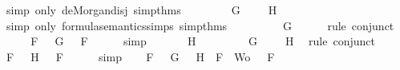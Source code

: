 \begin{isabellebody}
\ {\isacharparenleft}simp\ only{\isacharcolon}\ de{\isacharunderscore}Morgan{\isacharunderscore}disj\ simp{\isacharunderscore}thms{\isacharparenleft}{}{\isacharparenright}{\isacharparenright}\isanewline
\ \ \isamarkupfalse%
\ \isamarkupfalse%
\ {\isachardoublequoteopen}{\isasymA}\ {\isasymTurnstile}\ \isactrlbold {\isasymnot}\ G\ {\isasymand}\ {\isasymA}\ {\isasymTurnstile}\ \isactrlbold {\isasymnot}\ H{\isachardoublequoteclose}\isanewline
\ \ \ \ \isamarkupfalse%
\ {\isacharparenleft}simp\ only{\isacharcolon}\ formula{\isacharunderscore}semantics{\isachardot}simps{\isacharparenleft}{}{\isacharparenright}\ simp{\isacharunderscore}thms{\isacharparenleft}{}{\isacharparenright}{\isacharparenright}\ \isanewline
\ \ \isamarkupfalse%
\ \isamarkupfalse%
\ {\isachardoublequoteopen}{\isasymA}\ {\isasymTurnstile}\ \isactrlbold {\isasymnot}\ G{\isachardoublequoteclose}\isanewline
\ \ \ \ \isamarkupfalse%
\ {\isacharparenleft}rule\ conjunct{}{\isacharparenright}\isanewline
\ \ \isamarkupfalse%
\ \isamarkupfalse%
\ {}{\isacharcolon}{\isachardoublequoteopen}{\isasymforall}F\ {\isasymin}\ {\isacharbraceleft}\isactrlbold {\isasymnot}\ G{\isacharbraceright}{\isachardot}\ {\isasymA}\ {\isasymTurnstile}\ F{\isachardoublequoteclose}\isanewline
\ \ \ \ \isamarkupfalse%
\ simp\isanewline
\ \ \isamarkupfalse%
\ {\isachardoublequoteopen}{\isasymA}\ {\isasymTurnstile}\ \isactrlbold {\isasymnot}\ H{\isachardoublequoteclose}\isanewline
\ \ \ \ \isamarkupfalse%
\ {\isacartoucheopen}{\isasymA}\ {\isasymTurnstile}\ \isactrlbold {\isasymnot}\ G\ {\isasymand}\ {\isasymA}\ {\isasymTurnstile}\ \isactrlbold {\isasymnot}\ H{\isacartoucheclose}\ \isamarkupfalse%
\ {\isacharparenleft}rule\ conjunct{}{\isacharparenright}\isanewline
\ \ \isamarkupfalse%
\ \isamarkupfalse%
\ {}{\isacharcolon}{\isachardoublequoteopen}{\isasymforall}F\ {\isasymin}\ {\isacharbraceleft}\isactrlbold {\isasymnot}\ H{\isacharbraceright}{\isachardot}\ {\isasymA}\ {\isasymTurnstile}\ F{\isachardoublequoteclose}\isanewline
\ \ \ \ \isamarkupfalse%
\ simp\isanewline
\ \ \isamarkupfalse%
\ {\isachardoublequoteopen}{\isasymforall}F\ {\isasymin}\ {\isacharparenleft}{\isacharbraceleft}\isactrlbold {\isasymnot}\ G{\isacharbraceright}\ {\isasymunion}\ {\isacharbraceleft}\isactrlbold {\isasymnot}\ H{\isacharbraceright}{\isacharparenright}\ {\isasymunion}\ {\isacharparenleft}{\isacharbraceleft}F{\isacharbraceright}\ {\isasymunion}\ Wo{\isacharparenright}{\isachardot}\ {\isasymA}\ {\isasymTurnstile}\ F{\isachardoublequoteclose}\isanewline

\end{isabellebody}
